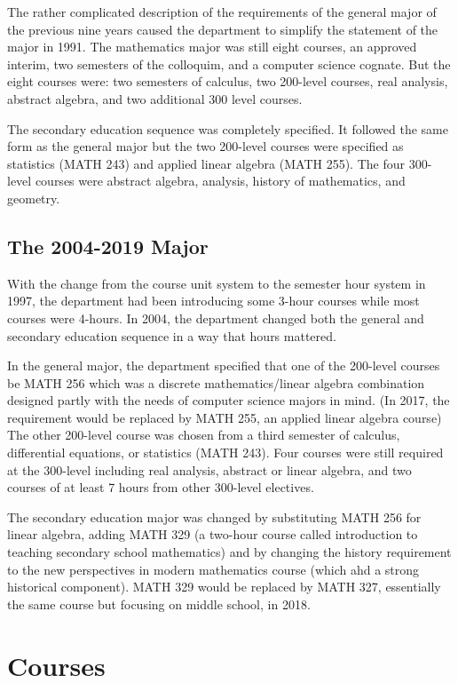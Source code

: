 \documentclass[
]{book}
\begin{document}
The rather complicated description of the requirements of the general major of the previous nine years caused the department to simplify the statement of the major in 1991. The mathematics major was still eight courses, an approved interim, two semesters of the colloquim, and a computer science cognate. But the eight courses were: two semesters of calculus, two 200-level courses, real analysis, abstract algebra, and two additional 300 level courses.

The secondary education sequence was completely specified. It followed the same form as the general major but the two 200-level courses were specified as statistics (MATH 243) and applied linear algebra (MATH 255). The four 300-level courses were abstract algebra, analysis, history of mathematics, and geometry.

\hypertarget{the-2004-2019-major}{%
\section{The 2004-2019 Major}\label{the-2004-2019-major}}

With the change from the course unit system to the semester hour system in 1997, the department had been introducing some 3-hour courses while most courses were 4-hours. In 2004, the department changed both the general and secondary education sequence in a way that hours mattered.

In the general major, the department specified that one of the 200-level courses be MATH 256 which was a discrete mathematics/linear algebra combination designed partly with the needs of computer science majors in mind. (In 2017, the requirement would be replaced by MATH 255, an applied linear algebra course) The other 200-level course was chosen from a third semester of calculus, differential equations, or statistics (MATH 243). Four courses were still required at the 300-level including real analysis, abstract or linear algebra, and two courses of at least 7 hours from other 300-level electives.

The secondary education major was changed by substituting MATH 256 for linear algebra, adding MATH 329 (a two-hour course called introduction to teaching secondary school mathematics) and by changing the history requirement to the new perspectives in modern mathematics course (which ahd a strong historical component).
MATH 329 would be replaced by MATH 327, essentially the same course but focusing on middle school, in 2018.

\hypertarget{courses}{%
\chapter{Courses}\label{courses}}
\end{document}
